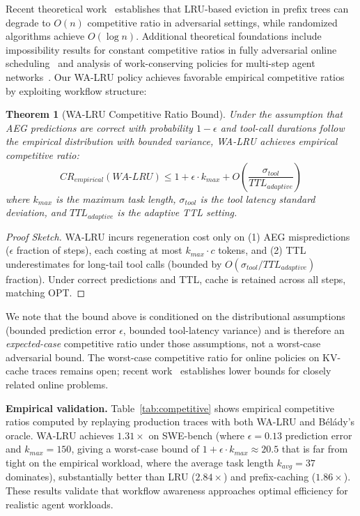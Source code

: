 \documentclass[sigconf]{acmart}
\newtheorem{theorem}{Theorem}
\begin{document}
Recent theoretical work~\cite{randomkv2026} establishes that LRU-based eviction in prefix trees can degrade to $O(n)$ competitive ratio in adversarial settings, while randomized algorithms achieve $O(\log n)$. Additional theoretical foundations include impossibility results for constant competitive ratios in fully adversarial online scheduling~\cite{jaillet2025online} and analysis of work-conserving policies for multi-step agent networks~\cite{li2025throughputoptimalschedulingalgorithmsllm}. Our WA-LRU policy achieves favorable empirical competitive ratios by exploiting workflow structure:

\begin{theorem}[WA-LRU Competitive Ratio Bound]
\label{thm:competitive}
Under the assumption that AEG predictions are correct with probability $1-\epsilon$ and tool-call durations follow the empirical distribution with bounded variance, WA-LRU achieves empirical competitive ratio:
\begin{equation}
    CR_{empirical}(WA\text{-}LRU) \leq 1 + \epsilon \cdot k_{max} + O\left(\frac{\sigma_{tool}}{TTL_{adaptive}}\right)
\end{equation}
where $k_{max}$ is the maximum task length, $\sigma_{tool}$ is the tool latency standard deviation, and $TTL_{adaptive}$ is the adaptive TTL setting.
\end{theorem}

\begin{proof}[Proof Sketch]
WA-LRU incurs regeneration cost only on (1) AEG mispredictions ($\epsilon$ fraction of steps), each costing at most $k_{max} \cdot c$ tokens, and (2) TTL underestimates for long-tail tool calls (bounded by $O(\sigma_{tool}/TTL_{adaptive})$ fraction). Under correct predictions and TTL, cache is retained across all steps, matching OPT.
\end{proof}

We note that the bound above is conditioned on the distributional assumptions (bounded prediction error $\epsilon$, bounded tool-latency variance) and is therefore an \emph{expected-case} competitive ratio under those assumptions, not a worst-case adversarial bound. The worst-case competitive ratio for online policies on KV-cache traces remains open; recent work~\cite{randomkv2026,jaillet2025online} establishes lower bounds for closely related online problems.

\textbf{Empirical validation.} Table~\ref{tab:competitive} shows empirical competitive ratios computed by replaying production traces with both WA-LRU and B\'{e}l\'{a}dy's oracle. WA-LRU achieves $1.31\times$ on SWE-bench (where $\epsilon = 0.13$ prediction error and $k_{max} = 150$, giving a worst-case bound of $1 + \epsilon \cdot k_{max} \approx 20.5$ that is far from tight on the empirical workload, where the average task length $k_{avg} = 37$ dominates), substantially better than LRU ($2.84\times$) and prefix-caching ($1.86\times$). These results validate that workflow awareness approaches optimal efficiency for realistic agent workloads.
\end{document}
